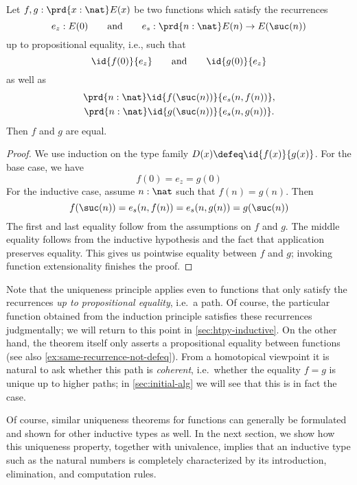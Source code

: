 \begin{thm}\label{thm:nat-uniq}
Let $f,g : \prd{x:\nat} E(x)$ be two functions which satisfy the recurrences
%
\begin{equation*}
  e_z : E(0)
  \qquad\text{and}\qquad
  e_s : \prd{n : \nat} E(n) \to E(\suc(n))
\end{equation*}
%
up to propositional equality, i.e., such that
\begin{equation*}
  \id{f(0)}{e_z}
  \qquad\text{and}\qquad
  \id{g(0)}{e_z}
\end{equation*}
as well as
\begin{gather*}
  \prd{n : \nat} \id{f(\suc(n))}{e_s(n, f(n))},\\
  \prd{n : \nat} \id{g(\suc(n))}{e_s(n, g(n))}.
\end{gather*}
Then $f$ and $g$ are equal.
\end{thm}

\begin{proof}
We use induction on the type family $D(x) \defeq \id{f(x)}{g(x)}$. For the base case, we have \[f(0) = e_z = g(0)\]
For the inductive case, assume $n : \nat$ such that $f(n) = g(n)$. Then
\[ f(\suc(n)) = e_s(n, f(n)) = e_s(n, g(n)) = g(\suc(n)) \]
The first and last equality follow from the assumptions on $f$ and $g$. The middle equality follows from the inductive hypothesis and the fact that application preserves equality. This gives us pointwise equality between $f$ and $g$; invoking function extensionality finishes the proof.
\end{proof}

Note that the uniqueness principle applies even to functions that only satisfy the recurrences \emph{up to propositional equality}, i.e.\ a path.
Of course, the particular function obtained from the induction principle satisfies these recurrences judgmentally; we will return to this point in \autoref{sec:htpy-inductive}.
On the other hand, the theorem itself only asserts a propositional equality between functions (see also \autoref{ex:same-recurrence-not-defeq}).
From a homotopical viewpoint it is natural to ask whether this path is \emph{coherent}, i.e.\ whether the equality $f=g$ is unique up to higher paths; in \autoref{sec:initial-alg} we will see that this is in fact the case.

Of course, similar uniqueness theorems for functions can generally be formulated and shown for other inductive types as well.
In the next section, we show how this uniqueness property, together with univalence, implies that an inductive type such as the natural numbers is completely characterized by its introduction, elimination, and computation rules.

